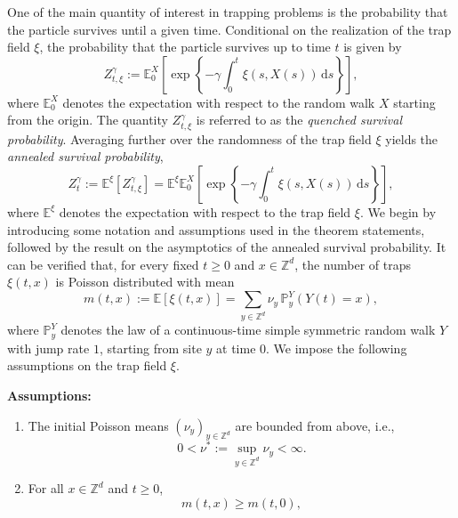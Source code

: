 \documentclass{article}[12pt]
\theoremstyle{definition}
\newcommand{\Z}{\mathbb{Z}}
\newcommand{\pr}{\mathbb{P}}
\newcommand{\E}{\mathbb{E}}
\newcommand{\1}{\mathbbm{1}}
\newcommand{\dd }{\mathrm{d} }
\begin{document}
One of the main quantity of interest in trapping problems is the probability that the particle survives until a given time. Conditional on the realization of the trap field $\xi$, the probability that the particle survives up to time $t$ is given by
$$Z_{t,\xi}^\gamma := \E_0^X\left[\exp\left\{-\gamma\int_0^t \xi(s,X(s))\,\dd s\right\}\right],
$$
where $\E^X_0$ denotes the expectation with respect to the random walk $X$ starting from the origin. The quantity $Z_{t,\xi}^\gamma$ is referred to as the \emph{quenched survival probability}. Averaging further over the randomness of the trap field $\xi$ yields the \emph{annealed survival probability},
\begin{equation}
    Z_t^\gamma :=\E^\xi[Z_{t,\xi}^\gamma] = \E^\xi\E_0^X\left[\exp\left\{-\gamma\int_0^t \xi(s,X(s))\,\dd s\right\}\right],
\label{eqn:annealedSP}
\end{equation}
where $\E^\xi$ denotes the expectation with respect to the trap field $\xi$. We begin by introducing some notation and assumptions used in the theorem statements, followed by the result on the asymptotics of the annealed survival probability.
It can be verified that, for every fixed $t\ge0$ and $x\in \Z^d$, the number of traps $\xi(t,x)$ is Poisson distributed with mean
\begin{equation}
m(t,x) := \E[\xi(t,x)]= \sum_{y\in\mathbb{Z}^d} \nu_y\,\pr_y^Y(Y(t)=x),
\label{eqn:poissonmean}
\end{equation}
where $\pr_y^Y$ denotes the law of a continuous-time simple symmetric random walk $Y$ with jump rate $1$, starting from site $y$ at time $0$. We impose the following assumptions on the trap field $\xi$.

\noindent \textbf{Assumptions:}
\begin{enumerate}[label=(A\arabic*)]
    \item \label{list:A1}The initial Poisson means $(\nu_y)_{y\in \mathbb{Z}^d}$ are bounded from above, i.e.,
$$
0< \nu^* := \sup_{y\in \mathbb{Z}^d} \nu_y < \infty.
$$
\item \label{list:A2} For all $x\in \Z^d$ and $t\ge 0$,
  \begin{equation}
      m(t,x)\ge m(t,0),
      \label{eqn:pascalcond} 
  \end{equation}
\end{enumerate}
\end{document}
